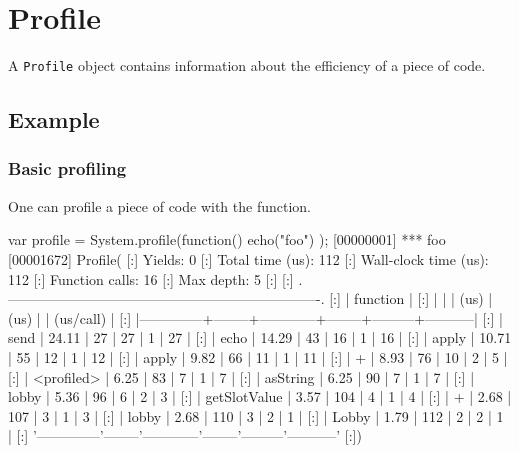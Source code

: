 
\section{Profile}

A \lstinline|Profile| object contains information about the efficiency of a
piece of code.

\subsection{Example}

\subsubsection{Basic profiling}

One can profile a piece of code with the  function.

\begin{urbiscript}
var profile = System.profile(function() { echo("foo") });
[00000001] *** foo
[00001672] Profile(
[:]  Yields:                    0
[:]  Total time (us):         112
[:]  Wall-clock time (us):    112
[:]  Function calls:           16
[:]  Max depth:                 5
[:]
[:]  .-------------------------------------------------------------------.
[:]  |   function   |   %
[:]  |              |        |    (us)    |  (us)  |         | (us/call) |
[:]  |--------------+--------+------------+--------+---------+-----------|
[:]  |         send |  24.11 |         27 |     27 |       1 |        27 |
[:]  |         echo |  14.29 |         43 |     16 |       1 |        16 |
[:]  |        apply |  10.71 |         55 |     12 |       1 |        12 |
[:]  |        apply |   9.82 |         66 |     11 |       1 |        11 |
[:]  |            + |   8.93 |         76 |     10 |       2 |         5 |
[:]  |   <profiled> |   6.25 |         83 |      7 |       1 |         7 |
[:]  |     asString |   6.25 |         90 |      7 |       1 |         7 |
[:]  |        lobby |   5.36 |         96 |      6 |       2 |         3 |
[:]  | getSlotValue |   3.57 |        104 |      4 |       1 |         4 |
[:]  |            + |   2.68 |        107 |      3 |       1 |         3 |
[:]  |        lobby |   2.68 |        110 |      3 |       2 |         1 |
[:]  |        Lobby |   1.79 |        112 |      2 |       2 |         1 |
[:]  '--------------'--------'------------'--------'---------'-----------'
[:])
\end{urbiscript}

